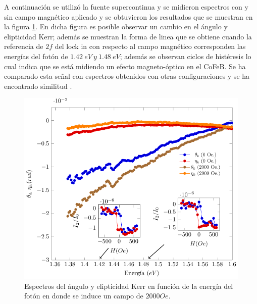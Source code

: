 \documentclass[paper=letter, fontsize=12pt]{scrartcl}
\numberwithin{equation}{section}		%
\numberwithin{figure}{section}			%
\numberwithin{table}{section}				%
\begin{document}
 \newline 
 \par A continuaci\'on se utiliz\'o la fuente supercontinua y se midieron espectros con y sin campo magn\'etico aplicado y se obtuvieron los resultados que se muestran en la figura \ref{Exp:fig:espectroK}. En dicha figura es posible observar un cambio en el \'angulo y elipticidad Kerr; adem\'as se muestran la forma de linea que se obtiene cuando la referencia de $2f$ del lock in con respecto al campo magn\'etico corresponden las energ\'ias del fot\'on de $1.42 ~eV~y~1.48~eV$; adem\'as se observan ciclos de hist\'eresis lo cual indica que se est\'a midiendo un efecto magneto-\'optico en el CoFeB. Se ha comparado esta se\~nal con espectros obtenidos con otras configuraciones y se ha encontrado similitud  \cite{Hoffmann_2019}.
\begin{figure}[!hbt]
	\centering
	\includegraphics[scale=0.8]{resexp/esp/espectro0.pdf}
	\caption[Espectro de efecto Kerr magneto-\'optico]{Espectros del \'angulo y elipticidad Kerr en funci\'on de la energ\'ia del fot\'on en donde se induce un campo de $2000 Oe$.}
	\label{Exp:fig:espectroK}
\end{figure}
\end{document}
